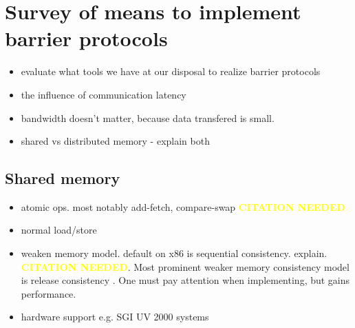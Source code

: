 \documentclass[a4paper, 10pt]{article}
\def \citationneeded{\textbf{\textcolor{yellow}{CITATION NEEDED}}}
\begin{document}
\section{Survey of means to implement barrier protocols}
\begin{itemize}
	\item evaluate what tools we have at our disposal to realize barrier protocols
	\item the influence of communication latency
	\item bandwidth doesn't matter, because data transfered is small.
	\item shared vs distributed memory - explain both
\end{itemize}

\subsection{Shared memory}
\begin{itemize}
	\item atomic ops. most notably add-fetch, compare-swap \citationneeded
	\item normal load/store
	\item weaken memory model. default on x86 is sequential consistency. explain. \citationneeded. Most prominent weaker memory consistency model is release consistency \cite{gha90}.
		One must pay attention when implementing, but gains performance.
	\item hardware support e.g. SGI UV 2000 systems\cite{sgiuv2000}
\end{itemize}

\end{document}
